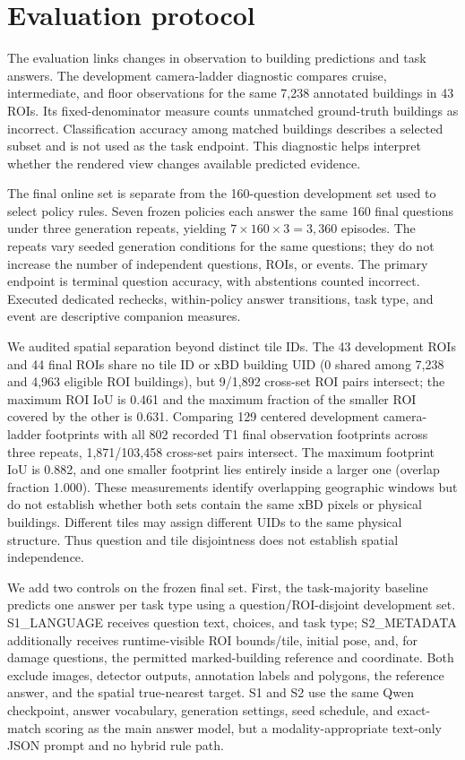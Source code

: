 \section{Evaluation protocol}
\label{sec:setup}
The evaluation links changes in observation to building predictions and task answers. The development camera-ladder diagnostic compares cruise, intermediate, and floor observations for the same 7,238 annotated buildings in 43 ROIs. Its fixed-denominator measure counts unmatched ground-truth buildings as incorrect. Classification accuracy among matched buildings describes a selected subset and is not used as the task endpoint. This diagnostic helps interpret whether the rendered view changes available predicted evidence.

The final online set is separate from the 160-question development set used to select policy rules. Seven frozen policies each answer the same 160 final questions under three generation repeats, yielding $7\times160\times3=3{,}360$ episodes. The repeats vary seeded generation conditions for the same questions; they do not increase the number of independent questions, ROIs, or events. The primary endpoint is terminal question accuracy, with abstentions counted incorrect. Executed dedicated rechecks, within-policy answer transitions, task type, and event are descriptive companion measures.

We audited spatial separation beyond distinct tile IDs. The 43 development ROIs and 44 final ROIs share no tile ID or xBD building UID (0 shared among 7,238 and 4,963 eligible ROI buildings), but 9/1,892 cross-set ROI pairs intersect; the maximum ROI IoU is 0.461 and the maximum fraction of the smaller ROI covered by the other is 0.631. Comparing 129 centered development camera-ladder footprints with all 802 recorded T1 final observation footprints across three repeats, 1,871/103,458 cross-set pairs intersect. The maximum footprint IoU is 0.882, and one smaller footprint lies entirely inside a larger one (overlap fraction 1.000). These measurements identify overlapping geographic windows but do not establish whether both sets contain the same xBD pixels or physical buildings. Different tiles may assign different UIDs to the same physical structure. Thus question and tile disjointness does not establish spatial independence.

We add two controls on the frozen final set. First, the task-majority baseline predicts one answer per task type using a question/ROI-disjoint development set. S1\_LANGUAGE receives question text, choices, and task type; S2\_METADATA additionally receives runtime-visible ROI bounds/tile, initial pose, and, for damage questions, the permitted marked-building reference and coordinate. Both exclude images, detector outputs, annotation labels and polygons, the reference answer, and the spatial true-nearest target. S1 and S2 use the same Qwen checkpoint, answer vocabulary, generation settings, seed schedule, and exact-match scoring as the main answer model, but a modality-appropriate text-only JSON prompt and no hybrid rule path.

